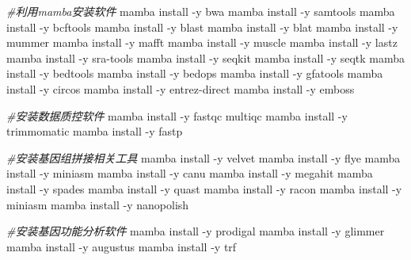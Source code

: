 \documentclass[
  10pt,
]{book}
\newenvironment{Shaded}{\begin{snugshade}}{\end{snugshade}}
\newcommand{\CommentTok}[1]{\textcolor[rgb]{0.56,0.35,0.01}{\textit{#1}}}
\newcommand{\NormalTok}[1]{#1}
\newcommand{\SpecialCharTok}[1]{\textcolor[rgb]{0.00,0.00,0.00}{#1}}
\begin{document}
\begin{Shaded}
\begin{Highlighting}[]
\CommentTok{\#利用mamba安装软件}
\NormalTok{mamba install }\SpecialCharTok{{-}}\NormalTok{y bwa }
\NormalTok{mamba install }\SpecialCharTok{{-}}\NormalTok{y samtools}
\NormalTok{mamba install }\SpecialCharTok{{-}}\NormalTok{y bcftools}
\NormalTok{mamba install }\SpecialCharTok{{-}}\NormalTok{y blast }
\NormalTok{mamba install }\SpecialCharTok{{-}}\NormalTok{y blat }
\NormalTok{mamba install }\SpecialCharTok{{-}}\NormalTok{y mummer }
\NormalTok{mamba install }\SpecialCharTok{{-}}\NormalTok{y mafft }
\NormalTok{mamba install }\SpecialCharTok{{-}}\NormalTok{y muscle }
\NormalTok{mamba install }\SpecialCharTok{{-}}\NormalTok{y lastz}
\NormalTok{mamba install }\SpecialCharTok{{-}}\NormalTok{y sra}\SpecialCharTok{{-}}\NormalTok{tools}
\NormalTok{mamba install }\SpecialCharTok{{-}}\NormalTok{y seqkit}
\NormalTok{mamba install }\SpecialCharTok{{-}}\NormalTok{y seqtk}
\NormalTok{mamba install }\SpecialCharTok{{-}}\NormalTok{y bedtools}
\NormalTok{mamba install }\SpecialCharTok{{-}}\NormalTok{y bedops}
\NormalTok{mamba install }\SpecialCharTok{{-}}\NormalTok{y gfatools}
\NormalTok{mamba install }\SpecialCharTok{{-}}\NormalTok{y circos}
\NormalTok{mamba install }\SpecialCharTok{{-}}\NormalTok{y entrez}\SpecialCharTok{{-}}\NormalTok{direct}
\NormalTok{mamba install }\SpecialCharTok{{-}}\NormalTok{y emboss}

\CommentTok{\#安装数据质控软件}
\NormalTok{mamba install }\SpecialCharTok{{-}}\NormalTok{y fastqc multiqc }
\NormalTok{mamba install }\SpecialCharTok{{-}}\NormalTok{y trimmomatic}
\NormalTok{mamba install }\SpecialCharTok{{-}}\NormalTok{y fastp}

\CommentTok{\#安装基因组拼接相关工具}
\NormalTok{mamba install }\SpecialCharTok{{-}}\NormalTok{y velvet}
\NormalTok{mamba install }\SpecialCharTok{{-}}\NormalTok{y flye}
\NormalTok{mamba install }\SpecialCharTok{{-}}\NormalTok{y miniasm}
\NormalTok{mamba install }\SpecialCharTok{{-}}\NormalTok{y canu}
\NormalTok{mamba install }\SpecialCharTok{{-}}\NormalTok{y megahit}
\NormalTok{mamba install }\SpecialCharTok{{-}}\NormalTok{y spades}
\NormalTok{mamba install }\SpecialCharTok{{-}}\NormalTok{y quast}
\NormalTok{mamba install }\SpecialCharTok{{-}}\NormalTok{y racon}
\NormalTok{mamba install }\SpecialCharTok{{-}}\NormalTok{y miniasm}
\NormalTok{mamba install }\SpecialCharTok{{-}}\NormalTok{y nanopolish}

\CommentTok{\#安装基因功能分析软件}
\NormalTok{mamba install }\SpecialCharTok{{-}}\NormalTok{y prodigal}
\NormalTok{mamba install }\SpecialCharTok{{-}}\NormalTok{y glimmer}
\NormalTok{mamba install }\SpecialCharTok{{-}}\NormalTok{y augustus}
\NormalTok{mamba install }\SpecialCharTok{{-}}\NormalTok{y trf}


\end{Highlighting}
\end{Shaded}
\end{document}
